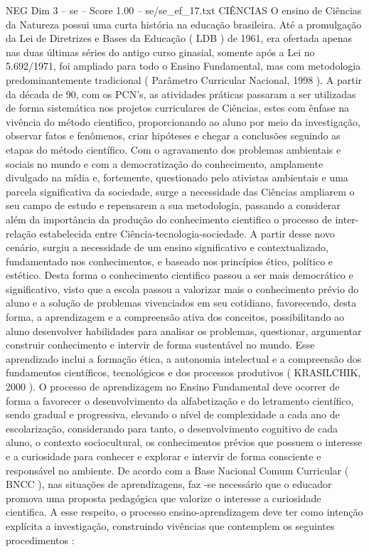 \begin{textsample}{NEG Dim 3 – se – Score 1.00 – se/se\_ef\_17.txt}  \label{ex:f3_neg_124}
CIÊNCIAS O ensino de Ciências da Natureza possui uma curta história na educação brasileira.
Até a promulgação da Lei de Diretrizes e Bases da Educação ( LDB ) de 1961, era ofertada apenas nas duas últimas séries do antigo curso ginasial, somente após a Lei no 5.692/1971, foi ampliado para todo o Ensino Fundamental, mas com metodologia predominantemente tradicional ( Parâmetro Curricular Nacional, 1998 ).
A partir da década de 90, com os PCN’s, as atividades práticas passaram a ser utilizadas de forma sistemática nos projetos curriculares de Ciências, estes com ênfase na vivência do método cientifico, proporcionando ao aluno por meio da investigação, observar fatos e fenômenos, criar hipóteses e chegar a conclusões seguindo as etapas do método científico.
Com o agravamento dos problemas ambientais e sociais no mundo e com a democratização do conhecimento, amplamente divulgado na mídia e, fortemente, questionado pelo ativistas ambientais e uma parcela significativa da sociedade, surge a necessidade das Ciências ampliarem o seu campo de estudo e repensarem a sua metodologia, passando a considerar além da importância da produção do conhecimento cientifico o processo de inter-relação estabelecida entre Ciência-tecnologia-sociedade.
A partir desse novo cenário, surgiu a necessidade de um ensino significativo e contextualizado, fundamentado nos conhecimentos, e baseado nos princípios ético, político e estético.
Desta forma o conhecimento cientifico passou a ser mais democrático e significativo, visto que a escola passou a valorizar mais o conhecimento prévio do aluno e a solução de problemas vivenciados em seu cotidiano, favorecendo, desta forma, a aprendizagem e a compreensão ativa dos conceitos, possibilitando ao aluno desenvolver habilidades para analisar os problemas, questionar, argumentar construir conhecimento e intervir de forma sustentável no mundo.
Esse aprendizado inclui a formação ética, a autonomia intelectual e a compreensão dos fundamentos científicos, tecnológicos e dos processos produtivos ( KRASILCHIK, 2000 ).
O processo de aprendizagem no Ensino Fundamental deve ocorrer de forma a favorecer o desenvolvimento da alfabetização e do letramento científico, sendo gradual e progressiva, elevando o nível de complexidade a cada ano de escolarização, considerando para tanto, o desenvolvimento cognitivo de cada aluno, o contexto sociocultural, os conhecimentos prévios que possuem o interesse e a curiosidade para conhecer e explorar e intervir de forma consciente e responsável no ambiente.
De acordo com a Base Nacional Comum Curricular ( BNCC ), nas situações de aprendizagens, faz -se necessário que o educador promova uma proposta pedagógica que valorize o interesse a curiosidade cientifica.
A esse respeito, o processo ensino-aprendizagem deve ter como intenção explícita a investigação, construindo vivências que contemplem os seguintes procedimentos :

\end{textsample}
